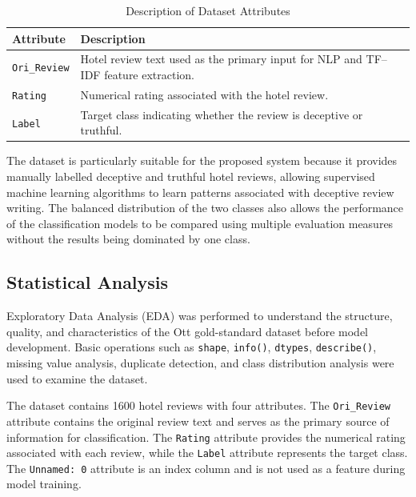\documentclass[12pt,a4paper]{report}
\begin{document}
\begin{table}[H]
\centering
\small
\renewcommand{\arraystretch}{1.3}
\begin{tabularx}{0.95\textwidth}{|>{\raggedright\arraybackslash}p{}|X|}
\hline
\textbf{Attribute} & \textbf{Description} \\
\hline
\texttt{Ori\_Review} & Hotel review text used as the primary input for NLP and TF--IDF feature extraction. \\
\hline
\texttt{Rating} & Numerical rating associated with the hotel review. \\
\hline
\texttt{Label} & Target class indicating whether the review is deceptive or truthful. \\
\hline
\end{tabularx}
\caption{Description of Dataset Attributes}
\label{tab:datasetattributes}
\end{table}

The dataset is particularly suitable for the proposed system because it provides manually labelled deceptive and truthful hotel reviews, allowing supervised machine learning algorithms to learn patterns associated with deceptive review writing. The balanced distribution of the two classes also allows the performance of the classification models to be compared using multiple evaluation measures without the results being dominated by one class.

\subsection{Statistical Analysis}

Exploratory Data Analysis (EDA) was performed to understand the structure, quality, and characteristics of the Ott gold-standard dataset before model development. Basic operations such as \texttt{shape}, \texttt{info()}, \texttt{dtypes}, \texttt{describe()}, missing value analysis, duplicate detection, and class distribution analysis were used to examine the dataset.

The dataset contains 1600 hotel reviews with four attributes. The \texttt{Ori\_Review} attribute contains the original review text and serves as the primary source of information for classification. The \texttt{Rating} attribute provides the numerical rating associated with each review, while the \texttt{Label} attribute represents the target class. The \texttt{Unnamed: 0} attribute is an index column and is not used as a feature during model training.
\end{document}
